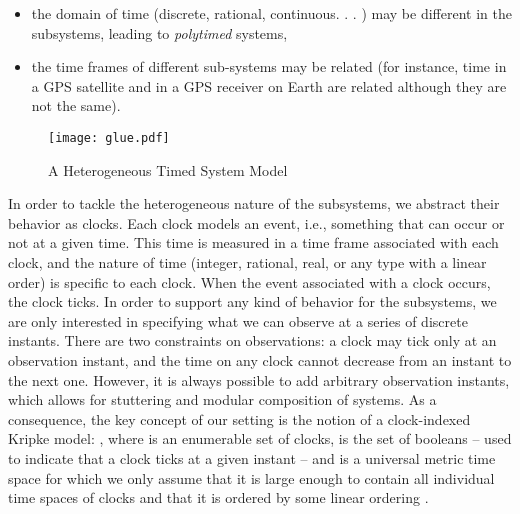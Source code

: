 \begin{isabellebody}
\begin{isamarkuptext}
\begin{itemize}
\item the domain of time (discrete, rational, continuous. . . ) may be different in the subsystems, 
leading to \emph{polytimed} systems,

\item the time frames of different sub-systems may be related (for instance, time in a GPS satellite 
and in a GPS receiver on Earth are related although they are not the same).%
\end{itemize}%
\end{isamarkuptext}\isamarkuptrue%
%
\begin{isamarkuptext}%
\begin{figure}[htbp]
 \centering
 \texttt{[image: glue.pdf]}
 \caption{A Heterogeneous Timed System Model}
 \label{fig:het-timed-system}
\end{figure}%
\end{isamarkuptext}\isamarkuptrue%
%
\begin{isamarkuptext}%
In order to tackle the heterogeneous nature of the subsystems, we abstract their behavior as clocks. 
Each clock models an event, i.e., something that can occur or not at a given time. This time is measured 
in a time frame associated with each clock, and the nature of time (integer, rational, real, or any 
type with a linear order) is specific to each clock. 
When the event associated with a clock occurs, the clock ticks. In order to support any kind of 
behavior for the subsystems, we are only interested in specifying what we can observe at a series 
of discrete instants. There are two constraints on observations: a clock may tick only at an 
observation instant, and the time on any clock cannot decrease from an instant to the next one. 
However, it is always possible to add arbitrary observation instants, which allows for stuttering 
and modular composition of systems. 
As a consequence, the key concept of our setting is the notion of a clock-indexed Kripke model: 
\isa{{\isasymSigma}\isactrlsup {\isasyminfinity}\ {\isacharequal}\ {\isasymnat}\ {\isasymrightarrow}\ {\isasymK}\ {\isasymrightarrow}\ {\isacharparenleft}{\isasymbool}\ {\isasymtimes}\ {\isasymT}{\isacharparenright}}, where \isa{{\isasymK}} is an enumerable set of clocks, \isa{{\isasymbool}} 
is the set of booleans – used to  indicate that a clock ticks at a given instant – and \isa{{\isasymT}} 
is a universal metric time space for which we only assume that it is large enough to contain all 
individual time spaces of clocks and that it is ordered by some linear ordering \isa{{\isacharparenleft}{\isasymle}\isactrlsub {\isasymT}{\isacharparenright}}.%

\end{isamarkuptext}
\end{isabellebody}
